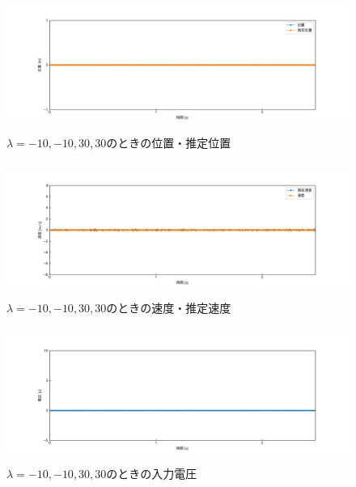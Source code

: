 \documentclass[12pt]{jsarticle}
\begin{document}
\begin{figure}[H]
  \begin{center}
    \includegraphics[clip,width=13.0cm, height=4.4cm]{../img/Exp8-1.png}
    \caption{$\lambda=-10, -10, 30, 30$のときの位置・推定位置}
    \label{Exp8-1}
  \end{center}
\end{figure}
\begin{figure}[H]
  \begin{center}
    \includegraphics[clip,width=13.0cm, height=4.4cm]{../img/Exp8-2.png}
    \caption{$\lambda=-10, -10, 30, 30$のときの速度・推定速度}
    \label{Exp8-2}
  \end{center}
\end{figure}
\begin{figure}[H]
  \begin{center}
    \includegraphics[clip,width=13.0cm, height=4.4cm]{../img/Exp8-3.png}
    \caption{$\lambda=-10, -10, 30, 30$のときの入力電圧}
    \label{Exp8-3}
  \end{center}
\end{figure}
\end{document}

